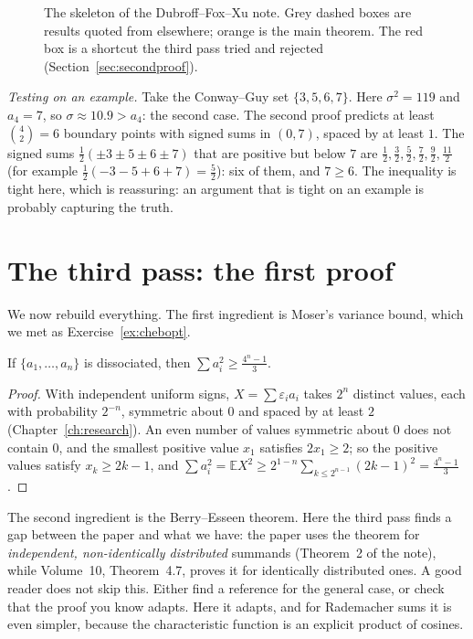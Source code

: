 \begin{figure}[ht]
\centering
{}
\caption{The skeleton of the Dubroff--Fox--Xu note. Grey dashed boxes are results quoted from elsewhere; orange is the main theorem. The red
box is a shortcut the third pass tried and rejected (Section~\ref{sec:secondproof}).}
\label{fig:skeleton}
\end{figure}

\emph{Testing on an example.} Take the Conway--Guy set $\{3,5,6,7\}$. Here $\sigma^2=119$ and $a_4=7$, so $\sigma\approx10.9>a_4$: the second case. The second proof
predicts at least $\binom42=6$ boundary points with signed sums in $(0,7)$, spaced by at least $1$. The signed sums $\frac12(\pm3\pm5\pm6\pm7)$ that are positive but below $7$
are $\frac12,\frac32,\frac52,\frac72,\frac92,\frac{11}2$ (for example $\frac12(-3-5+6+7)=\frac52$): six of them, and $7\ge6$. The inequality is tight here, which is reassuring:
an argument that is tight on an example is probably capturing the truth.

\section{The third pass: the first proof}

We now rebuild everything. The first ingredient is Moser's variance bound, which we met as Exercise~\ref{ex:chebopt}.

\begin{lemma}[Moser]\label{lem:moser}
If $\{a_1,\dots,a_n\}$ is dissociated, then $\sum a_i^2\ge\frac{4^n-1}3$.
\end{lemma}

\begin{proof}
With independent uniform signs, $X=\sum\varepsilon_ia_i$ takes $2^n$ distinct values, each with probability $2^{-n}$, symmetric about $0$ and spaced by at least $2$
(Chapter~\ref{ch:research}). An even number of values symmetric about $0$ does not contain $0$, and the smallest positive value $x_1$ satisfies $2x_1\ge2$; so
the positive values satisfy $x_k\ge2k-1$, and $\sum a_i^2=\mathbb EX^2\ge2^{1-n}\sum_{k\le2^{n-1}}(2k-1)^2=\frac{4^n-1}3$.
\end{proof}

The second ingredient is the Berry--Esseen theorem. Here the third pass finds a gap between the paper and what we have: the paper uses the
theorem for \emph{independent, non-identically distributed} summands (Theorem~2 of the note), while Volume~10, Theorem~4.7, proves it for identically
distributed ones. A good reader does not skip this. Either find a reference for the general case, or check that the proof you know adapts. Here
it adapts, and for Rademacher sums it is even simpler, because the characteristic function is an explicit product of cosines.

